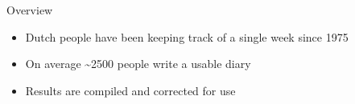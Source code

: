 \documentclass[aspectratio=169]{beamer}
\begin{document}
    {
    \begin{frame}{Overview}
        \begin{itemize}
            \item Dutch people have been keeping track of a single week since 1975
            \item On average \textasciitilde2500 people write a usable diary
            \item Results are compiled and corrected for use
        \end{itemize}
    \end{frame}
    }
\end{document}
